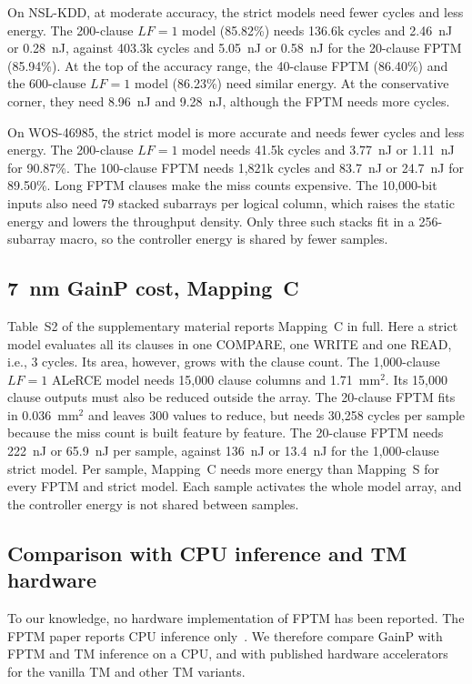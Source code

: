 \documentclass[preprint,review,12pt]{elsarticle}
\newcommand{\gainp}{GainP}
\newcommand{\hyp}[1]{#1}   %
\newcommand{\LF}{\mathit{LF}}
\newcommand{\wosnew}[1]{#1}   %
\begin{document}
On NSL-KDD, at moderate accuracy, the strict models need fewer cycles and less energy.
The 200-clause $\LF=1$ model (85.82\%) needs 136.6k cycles and \hyp{2.46~nJ or 0.28~nJ}, against 403.3k cycles and \hyp{5.05~nJ or 0.58~nJ} for the 20-clause FPTM (85.94\%).
At the top of the accuracy range, the 40-clause FPTM (86.40\%) and the 600-clause $\LF=1$ model (86.23\%) need similar energy. At the conservative corner, they need \hyp{8.96~nJ and 9.28~nJ}, although the FPTM needs more cycles.

On WOS-46985, the strict model is more accurate and needs fewer cycles and less energy.
The 200-clause $\LF=1$ model needs 41.5k cycles and \hyp{3.77~nJ or 1.11~nJ} for 90.87\%.
The 100-clause FPTM needs 1,821k cycles and \hyp{83.7~nJ or 24.7~nJ} for 89.50\%.
Long FPTM clauses make the miss counts expensive. The 10,000-bit inputs also need 79 stacked subarrays per logical column, which raises the static energy and lowers the throughput density. \hyp{Only three such stacks fit in a 256-subarray macro, so the controller energy is shared by fewer samples.}

\subsection{7~nm \gainp{} cost, Mapping~C}\label{sec:mapCres}
\wosnew{Table~S2 of the supplementary material reports Mapping~C in full.}
Here a strict model evaluates all its clauses in one COMPARE, one WRITE and one READ, i.e., 3 cycles.
Its area, however, grows with the clause count. The 1,000-clause $\LF=1$ ALeRCE model needs 15,000 clause columns and \hyp{1.71~mm$^2$}.
Its 15,000 clause outputs must also be reduced outside the array.
The 20-clause FPTM fits in \hyp{0.036~mm$^2$} and leaves 300 values to reduce, but needs 30,258 cycles per sample because the miss count is built feature by feature.
\wosnew{The 20-clause FPTM needs} \hyp{222~nJ or 65.9~nJ} \wosnew{per sample, against} \hyp{136~nJ or 13.4~nJ} \wosnew{for the 1,000-clause strict model.}
Per sample, Mapping~C needs more energy than Mapping~S for every FPTM and strict model. Each sample activates the whole model array, and the controller energy is not shared between samples.


\subsection{Comparison with CPU inference and TM hardware}\label{sec:compare}
To our knowledge, no hardware implementation of FPTM has been reported. The FPTM paper reports CPU inference only~\cite{hnilov2025fptm}.
We therefore compare \gainp{} with FPTM and TM inference on a CPU, and with published hardware accelerators for the vanilla TM and other TM variants.
\end{document}

